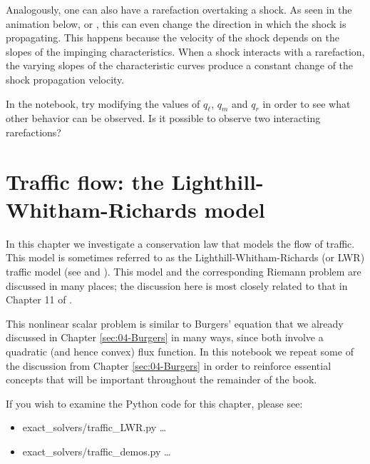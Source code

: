 \documentclass{SIAMbook2016}
\providecommand{\tightlist}{%
      \setlength{\itemsep}{0pt}\setlength{\parskip}{0pt}}
\begin{document}
Analogously, one can also have a rarefaction overtaking a shock. As seen
in the animation below, or
, this can even change the direction in which the shock is
propagating. This happens because the velocity of the shock depends on
the slopes of the impinging characteristics. When a shock interacts with
a rarefaction, the varying slopes of the characteristic curves produce a
constant change of the shock propagation velocity.

In the notebook, try modifying the values of \(q_\ell\), \(q_m\) and
\(q_r\) in order to see what other behavior can be observed. Is it
possible to observe two interacting rarefactions?

\hypertarget{traffic-flow-the-lighthill-whitham-richards-model}{%
\chapter{Traffic flow: the Lighthill-Whitham-Richards
model}\label{traffic-flow-the-lighthill-whitham-richards-model}}
\label{sec:05-Traffic_flow}
In this chapter we investigate a conservation law that models the flow
of traffic. This model is sometimes referred to as the
Lighthill-Whitham-Richards (or LWR) traffic model (see
\cite{lighthill1955kinematic} and \cite{richards1956shock}). This model
and the corresponding Riemann problem are discussed in many places; the
discussion here is most closely related to that in Chapter 11 of
\cite{fvmhp}.

This nonlinear scalar problem is similar to Burgers' equation that we
already discussed in Chapter \ref{sec:04-Burgers} in many ways, since
both involve a quadratic (and hence convex) flux function. In this
notebook we repeat some of the discussion from
Chapter \ref{sec:04-Burgers} in order to reinforce essential concepts
that will be important throughout the remainder of the book.

If you wish to examine the Python code for this chapter, please see:

\begin{itemize}
\tightlist
\item
  {exact\_solvers/traffic\_LWR.py} \ldots{}
\item
  {exact\_solvers/traffic\_demos.py} \ldots{}
\end{itemize}
\end{document}
